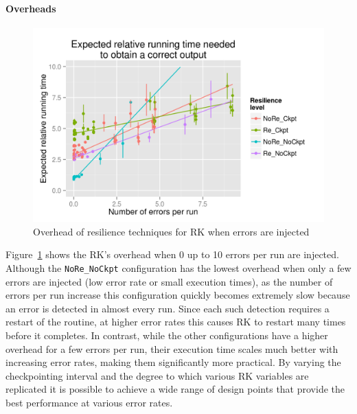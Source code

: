 \documentclass{sig-alternate}
\begin{document}
\paragraph{Overheads}



\begin{figure}[ht!]
\centering
\includegraphics[width=1.00\columnwidth]{figs/4_1_2_Exp2_Expected_Running_Time_Needed.png}
\caption{Overhead of resilience techniques for RK when errors are injected}
\label{fig:rk_routine_exp_exec}
\end{figure}

Figure~\ref{fig:rk_routine_exp_exec} shows the RK's overhead when 0 up to 10 errors per run are injected.%
Although the \texttt{NoRe\_NoCkpt} configuration has the lowest overhead when only a few errors are injected (low error rate or small execution times), as the number of errors per run increase this configuration quickly becomes extremely slow because an error is detected in almost every run.
Since each such detection requires a restart of the routine, at higher error rates this causes RK to restart many times before it completes.
In contrast, while the other configurations have a higher overhead for a few errors per run, their execution time scales much better with increasing error rates, making them significantly more practical.
By varying the checkpointing interval and the degree to which various RK variables are replicated it is possible to achieve a wide range of design points that provide the best performance at various error rates.
\end{document}
